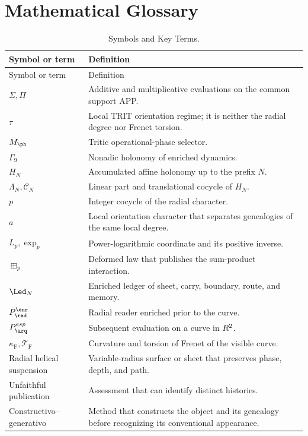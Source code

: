 \chapter{Mathematical Glossary}

\begin{longtable}{p{}p{}}
\caption{Symbols and Key Terms.}
\label{espiral:tab:glosario}\\
\toprule
Symbol or term&Definition\\
\midrule
\endfirsthead
\toprule
Symbol or term&Definition\\
\midrule
\endhead
\(\Sigma,\Pi\)&Additive and multiplicative evaluations on the common support APP.\\
\(\tau\)&Local TRIT orientation regime; it is neither the radial degree nor
Frenet torsion.\\
\(M_{\ph}\)&Tritic operational-phase selector.\\
\(\Gamma_9\)&Nonadic holonomy of enriched dynamics.\\
\(H_N\)&Accumulated affine holonomy up to the prefix \(N\).\\
\(\Lambda_N,\mathcal C_N\)&Linear part and translational cocycle of \(H_N\).\\
\(p\)&Integer cocycle of the radial character.\\
\(a\)&Local orientation character that separates genealogies of the same
local degree.\\
\(L_p,\exp_p\)&Power-logarithmic coordinate and its positive inverse.\\
\(\boxplus_p\)&Deformed law that publishes the sum-product interaction.\\
\(\Led_N\)&Enriched ledger of sheet, carry, boundary, route, and memory.\\
\(\mathcal P_{\rad}^{\enr}\)&Radial reader enriched prior to the curve.\\
\(\mathcal P_{\arq}^{\mathrm{esp}}\)&Subsequent evaluation on a curve in
\(R^2\).\\
\(\kappa_{\mathrm{F}},\mathcal T_{\mathrm{F}}\)&Curvature and torsion of Frenet of the
visible curve.\\
Radial helical suspension&Variable-radius surface or sheet that
preserves phase, depth, and path.\\
Unfaithful publication&Assessment that can identify distinct histories.\\
Constructivo--generativo&Method that constructs the object and its genealogy
before recognizing its conventional appearance.\\
\bottomrule
\end{longtable}
